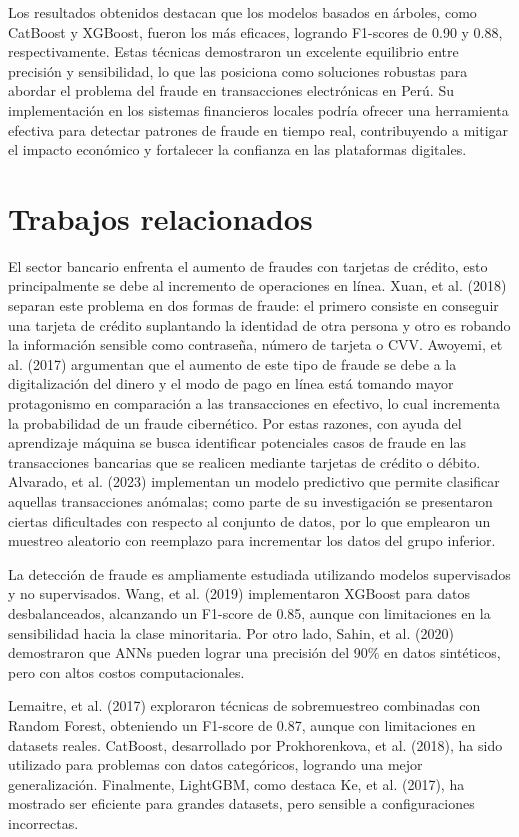 \documentclass[9pt,a4paper,twoside]{rho-class/rho}
\begin{document}
        Los resultados obtenidos destacan que los modelos basados en árboles, como CatBoost y XGBoost, fueron los más eficaces, logrando F1-scores de 0.90 y 0.88, respectivamente. Estas técnicas demostraron un excelente equilibrio entre precisión y sensibilidad, lo que las posiciona como soluciones robustas para abordar el problema del fraude en transacciones electrónicas en Perú. Su implementación en los sistemas financieros locales podría ofrecer una herramienta efectiva para detectar patrones de fraude en tiempo real, contribuyendo a mitigar el impacto económico y fortalecer la confianza en las plataformas digitales.

    \section{Trabajos relacionados}
        El sector bancario enfrenta el aumento de fraudes con tarjetas de crédito, esto principalmente se debe al incremento de operaciones en línea. Xuan, et al. (2018) separan este problema en dos formas de fraude: el primero consiste en conseguir una tarjeta de crédito suplantando la identidad de otra persona y otro es robando la información sensible como contraseña, número de tarjeta o CVV. Awoyemi, et al. (2017) argumentan que el aumento de este tipo de fraude se debe a la digitalización del dinero y el modo de pago en línea está tomando mayor protagonismo en comparación a las transacciones en efectivo, lo cual incrementa la probabilidad de un fraude cibernético. Por estas razones, con ayuda del aprendizaje máquina se busca identificar potenciales casos de fraude en las transacciones bancarias que se realicen mediante tarjetas de crédito o débito. Alvarado, et al. (2023) implementan un modelo predictivo que permite clasificar aquellas transacciones anómalas; como parte de su investigación se presentaron ciertas dificultades con respecto al conjunto de datos, por lo que emplearon un muestreo aleatorio con reemplazo para incrementar los datos del grupo inferior.

        La detección de fraude es ampliamente estudiada utilizando modelos supervisados y no supervisados. Wang, et al. (2019) implementaron XGBoost para datos desbalanceados, alcanzando un F1-score de 0.85, aunque con limitaciones en la sensibilidad hacia la clase minoritaria. Por otro lado, Sahin, et al. (2020) demostraron que ANNs pueden lograr una precisión del 90\% en datos sintéticos, pero con altos costos computacionales.
    
        Lemaitre, et al. (2017) exploraron técnicas de sobremuestreo combinadas con Random Forest, obteniendo un F1-score de 0.87, aunque con limitaciones en datasets reales. CatBoost, desarrollado por Prokhorenkova, et al. (2018), ha sido utilizado para problemas con datos categóricos, logrando una mejor generalización. Finalmente, LightGBM, como destaca Ke, et al. (2017), ha mostrado ser eficiente para grandes datasets, pero sensible a configuraciones incorrectas.
\end{document}
